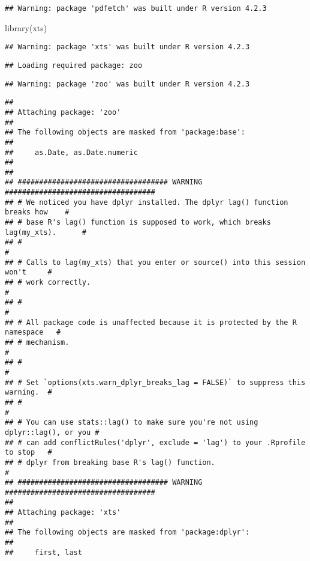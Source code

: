 \documentclass[
]{article}
\newenvironment{Shaded}{\begin{snugshade}}{\end{snugshade}}
\newcommand{\FunctionTok}[1]{\textcolor[rgb]{0.00,0.00,0.00}{#1}}
\newcommand{\NormalTok}[1]{#1}
\begin{document}
\begin{verbatim}
## Warning: package 'pdfetch' was built under R version 4.2.3
\end{verbatim}

\begin{Shaded}
\begin{Highlighting}[]
\FunctionTok{library}\NormalTok{(xts)}
\end{Highlighting}
\end{Shaded}

\begin{verbatim}
## Warning: package 'xts' was built under R version 4.2.3
\end{verbatim}

\begin{verbatim}
## Loading required package: zoo
\end{verbatim}

\begin{verbatim}
## Warning: package 'zoo' was built under R version 4.2.3
\end{verbatim}

\begin{verbatim}
## 
## Attaching package: 'zoo'
## 
## The following objects are masked from 'package:base':
## 
##     as.Date, as.Date.numeric
## 
## 
## ################################### WARNING ###################################
## # We noticed you have dplyr installed. The dplyr lag() function breaks how    #
## # base R's lag() function is supposed to work, which breaks lag(my_xts).      #
## #                                                                             #
## # Calls to lag(my_xts) that you enter or source() into this session won't     #
## # work correctly.                                                             #
## #                                                                             #
## # All package code is unaffected because it is protected by the R namespace   #
## # mechanism.                                                                  #
## #                                                                             #
## # Set `options(xts.warn_dplyr_breaks_lag = FALSE)` to suppress this warning.  #
## #                                                                             #
## # You can use stats::lag() to make sure you're not using dplyr::lag(), or you #
## # can add conflictRules('dplyr', exclude = 'lag') to your .Rprofile to stop   #
## # dplyr from breaking base R's lag() function.                                #
## ################################### WARNING ###################################
## 
## Attaching package: 'xts'
## 
## The following objects are masked from 'package:dplyr':
## 
##     first, last
\end{verbatim}
\end{document}
